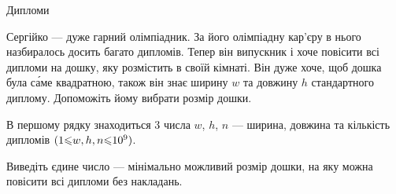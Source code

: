 ﻿\begin{problemAllDefault}{Дипломи}

Сергійко --- дуже гарний олімпіадник. За його олімпіадну кар'єру в нього назбиралось досить багато дипломів. Тепер він випускник і хоче повісити всі дипломи на дошку, яку розмістить в своїй кімнаті. Він дуже хоче, щоб дошка була с\'{а}ме квадратною, також він знає ширину $w$ та довжину $h$ стандартного диплому. Допоможіть йому вибрати розмір дошки.

\InputFile
В першому рядку знаходиться 3 числа $w$, $h$, $n$ --- ширина, довжина та кількість дипломів $(1{\leqslant}w,h,n{\leqslant}10^9)$.

\OutputFile
Виведіть єдине число --- мінімально можливий розмір дошки, на яку можна повісити всі дипломи без накладань.

\Examples

\begin{example}
%
%
\end{example}

\end{problemAllDefault}

